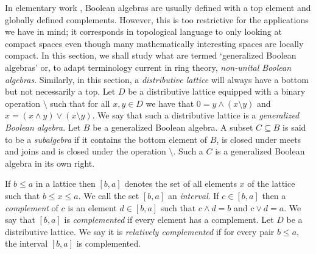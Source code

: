 \documentclass[a4paper]{amsart}
\begin{document}
In elementary work \cite{Johnstone}, Boolean algebras are usually defined with a top element and globally defined complements.
However, this is too restrictive for the applications we have in mind; it corresponds in topological language
to only looking at compact spaces even though many mathematically interesting spaces are locally compact.
In this section, we shall study what are termed `generalized Boolean algebras' or, to adapt terminology current in ring theory,
{\em non-unital Boolean algebras}.
Similarly, in this section, a {\em distributive lattice} will always have a bottom but not necessarily a top.
Let $D$ be a distributive lattice equipped with a binary operation $\setminus$ such that for all $x,y \in D$ we have that
$0 = y \wedge (x \setminus y)$ and $x = (x \wedge y) \vee (x \setminus y)$.
We say that such a distributive lattice is a {\em generalized Boolean algebra}.
Let $B$ be a generalized Boolean algebra.
A subset $C \subseteq B$ is said to be a {\em subalgebra} if it contains the bottom element of $B$,
is closed under meets and joins and is closed under the operation $\setminus$.
Such a $C$ is a generalized Boolean algebra in its own right.


If $b \leq a$ in a lattice then $[b,a]$ denotes the set of all elements $x$ of the lattice such that $b \leq x \leq a$.
We call the set $[b,a]$ an {\em interval}.
If $c \in [b,a]$ then a {\em complement} of $c$ is an element $d \in [b,a]$ such
that $c \wedge d = b$ and $c \vee d = a$.
We say that $[b,a]$ is {\em complemented} if every element has a complement.
Let $D$ be a distributive lattice.
We say it is {\em relatively complemented} if for every pair $b \leq a$,
the interval $[b,a]$ is complemented.
\end{document}

